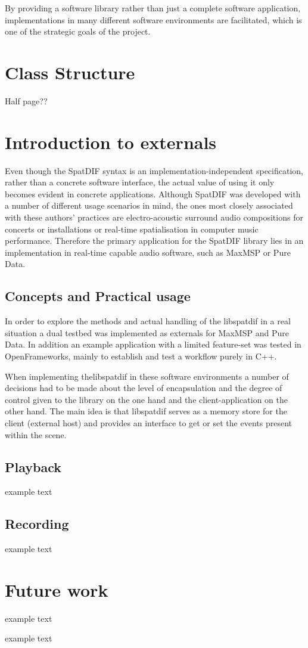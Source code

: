 \documentclass{article}
\begin{document}
By providing a software library rather than just a complete software application, implementations in many different software environments are facilitated, which is one of the strategic goals of the project.


\section{Class Structure}\label{sec:class_structure}
Half page??

\section{Introduction to externals}
Even though the SpatDIF syntax is an implementation-independent specification, rather than a concrete software interface, the actual value of using it only becomes evident in concrete applications. Although SpatDIF was developed with a number of different usage scenarios in mind, the ones most closely associated with these authors' practices are electro-acoustic surround audio compositions for concerts or installations or real-time spatialisation in computer music performance.
Therefore the primary application for the SpatDIF library lies in an implementation in real-time capable audio software, such as MaxMSP or Pure Data.

\subsection{Concepts and Practical usage}\label{subsec:concepts}
In order to explore the methods and actual handling of the libspatdif in a real situation a dual testbed was implemented as externals for MaxMSP and Pure Data. In addition an example application with a limited feature-set was tested in OpenFrameworks, mainly to establish and test a workflow purely in C++.

When implementing thelibspatdif in these software environments a number of decisions had to be made about the level of encapsulation and the degree of control given to the library on the one hand and the client-application on the other hand. The main idea is that libspatdif serves as a memory store for the client (external host) and provides an interface to get or set the events present within the scene. 




\subsection{Playback}\label{sec:Playback}
example text

\subsection{Recording}\label{sub:body}
example text

\section{Future work}
example text


\begin{acknowledgments}
example text
\end{acknowledgments} 

% 
\printbibliography
\end{document}

